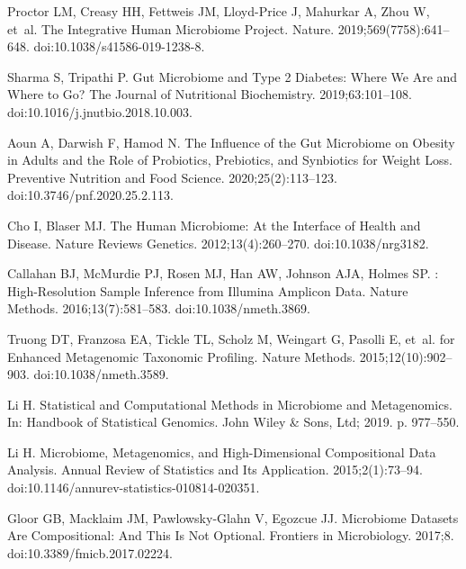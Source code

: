 \documentclass[10pt,letterpaper]{article}
\begin{document}
\begin{thebibliography}{10}

Proctor LM, Creasy HH, Fettweis JM, {Lloyd-Price} J, Mahurkar A, Zhou W, et~al.
\newblock The {{Integrative Human Microbiome Project}}.
\newblock Nature. 2019;569(7758):641--648.
\newblock doi:{10.1038/s41586-019-1238-8}.

Sharma S, Tripathi P.
\newblock Gut Microbiome and Type 2 Diabetes: Where We Are and Where to Go?
\newblock The Journal of Nutritional Biochemistry. 2019;63:101--108.
\newblock doi:{10.1016/j.jnutbio.2018.10.003}.

Aoun A, Darwish F, Hamod N.
\newblock The {{Influence}} of the {{Gut Microbiome}} on {{Obesity}} in
  {{Adults}} and the {{Role}} of {{Probiotics}}, {{Prebiotics}}, and
  {{Synbiotics}} for {{Weight Loss}}.
\newblock Preventive Nutrition and Food Science. 2020;25(2):113--123.
\newblock doi:{10.3746/pnf.2020.25.2.113}.

Cho I, Blaser MJ.
\newblock The Human Microbiome: At the Interface of Health and Disease.
\newblock Nature Reviews Genetics. 2012;13(4):260--270.
\newblock doi:{10.1038/nrg3182}.

Callahan BJ, McMurdie PJ, Rosen MJ, Han AW, Johnson AJA, Holmes SP.
: High-Resolution Sample Inference from {{Illumina}}
  Amplicon Data.
\newblock Nature Methods. 2016;13(7):581--583.
\newblock doi:{10.1038/nmeth.3869}.

Truong DT, Franzosa EA, Tickle TL, Scholz M, Weingart G, Pasolli E, et~al.
 for Enhanced Metagenomic Taxonomic Profiling.
\newblock Nature Methods. 2015;12(10):902--903.
\newblock doi:{10.1038/nmeth.3589}.

Li H.
\newblock Statistical and {{Computational Methods}} in {{Microbiome}} and
  {{Metagenomics}}.
\newblock In: Handbook of {{Statistical Genomics}}. {John Wiley \& Sons, Ltd};
  2019. p. 977--550.

Li H.
\newblock Microbiome, {{Metagenomics}}, and {{High}}-{{Dimensional
  Compositional Data Analysis}}.
\newblock Annual Review of Statistics and Its Application. 2015;2(1):73--94.
\newblock doi:{10.1146/annurev-statistics-010814-020351}.

Gloor GB, Macklaim JM, {Pawlowsky-Glahn} V, Egozcue JJ.
\newblock Microbiome {{Datasets Are Compositional}}: And {{This Is Not
  Optional}}.
\newblock Frontiers in Microbiology. 2017;8.
\newblock doi:{10.3389/fmicb.2017.02224}.


\end{thebibliography}
\end{document}
